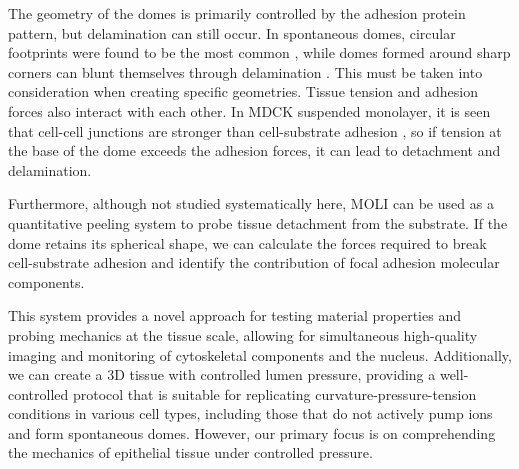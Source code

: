 The geometry of the domes is primarily controlled by the adhesion protein pattern, but delamination can still occur. In spontaneous domes, circular footprints were found to be the most common  \cite{tanner1983}, while domes formed around sharp corners can blunt themselves through delamination \cite{latorre2018}. This must be taken into consideration when creating specific geometries. Tissue tension and adhesion forces also interact with each other. In MDCK suspended monolayer, it is seen that cell-cell junctions are stronger than cell-substrate adhesion \cite{harris2012}, so if tension at the base of the dome exceeds the adhesion forces, it can lead to detachment and delamination.  

Furthermore, although not studied systematically here, MOLI can be used as a quantitative peeling system to probe tissue detachment from the substrate. If the dome retains its spherical shape, we can calculate the forces required to break cell-substrate adhesion and identify the contribution of focal adhesion molecular components.

This system provides a novel approach for testing material properties and probing mechanics at the tissue scale, allowing for simultaneous high-quality imaging and monitoring of cytoskeletal components and the nucleus. Additionally, we can create a 3D tissue with controlled lumen pressure, providing a well-controlled protocol that is suitable for replicating curvature-pressure-tension conditions in various cell types, including those that do not actively pump ions and form spontaneous domes. However, our primary focus is on comprehending the mechanics of epithelial tissue under controlled pressure.